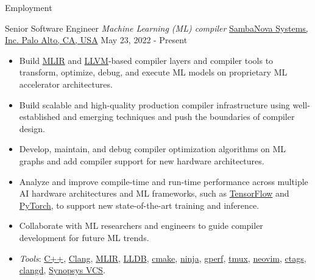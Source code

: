 \documentclass[]{mcdowellcv}
\begin{document}
  \makeheader

  \begin{cvsection}{Employment}
    \begin{cvsubsection}
      {Senior Software Engineer \linebreak \textit{Machine Learning (ML) compiler}}
      {\href{https://sambanova.ai/}{SambaNova Systems, Inc. \linebreak Palo Alto, CA, USA}}
      {May 23, 2022 - Present}
        \begin{itemize}
          \item
            Build \href{https://mlir.llvm.org/}{MLIR} and
            \href{https://llvm.org/}{LLVM}-based compiler layers and
            compiler tools to transform, optimize, debug, and execute ML
            models on proprietary ML accelerator architectures.
          \item
            Build scalable and high-quality production compiler
            infrastructure using well-established and emerging techniques
            and push the boundaries of compiler design.
          \item
            Develop, maintain, and debug compiler optimization algorithms
            on ML graphs and add compiler support for new hardware
            architectures.
          \item
            Analyze and improve compile-time and run-time performance
            across multiple AI hardware architectures and ML frameworks,
            such as \href{https://www.tensorflow.org/}{TensorFlow} and
            \href{https://pytorch.org/}{PyTorch}, to support new
            state-of-the-art training and inference.
          \item
            Collaborate with ML researchers and engineers to guide compiler
            development for future ML trends.
          \item
            \textit{Tools}: \href{https://isocpp.org/}{C++},
            \href{https://clang.llvm.org/}{Clang},
            \href{https://mlir.llvm.org/}{MLIR},
            \href{https://lldb.llvm.org/}{LLDB},
            \href{https://cmake.org/}{cmake},
            \href{https://ninja-build.org/}{ninja},
            \href{https://gperftools.github.io/gperftools/cpuprofile.html}{gperf},
            \href{https://github.com/tmux/tmux}{tmux},
            \href{https://neovim.io/}{neovim},
            \href{https://github.com/universal-ctags/ctags}{ctags},
            \href{https://clangd.llvm.org/}{clangd},
            \href{https://www.synopsys.com/verification/simulation/vcs.html}{Synopsys
            VCS}.
        \end{itemize}
    \end{cvsubsection}


\end{cvsection}
\end{document}
